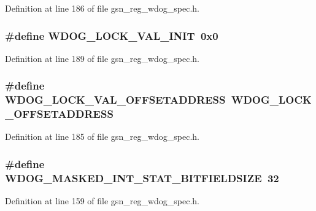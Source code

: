 Definition at line 186 of file gsn\_\-reg\_\-wdog\_\-spec.h.

\hypertarget{a00577_acd9a6583a7ebdf65df81623dbac013fc}{
\subsubsection[{WDOG\_\-LOCK\_\-VAL\_\-INIT}]{\setlength{\rightskip}{0pt plus 5cm}\#define WDOG\_\-LOCK\_\-VAL\_\-INIT~0x0}}
\label{a00577_acd9a6583a7ebdf65df81623dbac013fc}


Definition at line 189 of file gsn\_\-reg\_\-wdog\_\-spec.h.

\hypertarget{a00577_a7e737ffb4aaed49a90c108b3ec2e1835}{
\subsubsection[{WDOG\_\-LOCK\_\-VAL\_\-OFFSETADDRESS}]{\setlength{\rightskip}{0pt plus 5cm}\#define WDOG\_\-LOCK\_\-VAL\_\-OFFSETADDRESS~WDOG\_\-LOCK\_\-OFFSETADDRESS}}
\label{a00577_a7e737ffb4aaed49a90c108b3ec2e1835}


Definition at line 185 of file gsn\_\-reg\_\-wdog\_\-spec.h.

\hypertarget{a00577_ad05c738d0a2ea78186a0efdd7d45581a}{
\subsubsection[{WDOG\_\-MASKED\_\-INT\_\-STAT\_\-BITFIELDSIZE}]{\setlength{\rightskip}{0pt plus 5cm}\#define WDOG\_\-MASKED\_\-INT\_\-STAT\_\-BITFIELDSIZE~32}}
\label{a00577_ad05c738d0a2ea78186a0efdd7d45581a}


Definition at line 159 of file gsn\_\-reg\_\-wdog\_\-spec.h.

